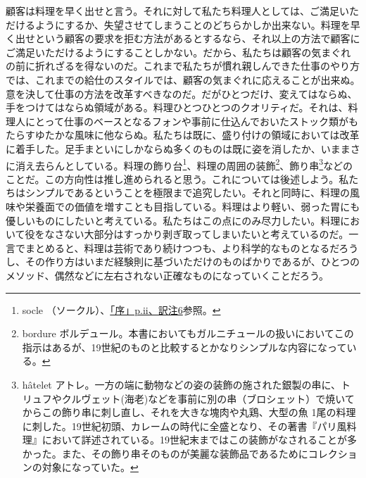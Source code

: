 顧客は料理を早く出せと言う。それに対して私たち料理人としては、ご満足いただけるようにするか、失望させてしまうことのどちらかしか出来ない。料理を早く出せという顧客の要求を拒む方法があるとするなら、それ以上の方法で顧客にご満足いただけるようにすることしかない。だから、私たちは顧客の気まぐれの前に折れざるを得ないのだ。これまで私たちが慣れ親しんできた仕事のやり方では、これまでの給仕のスタイルでは、顧客の気まぐれに応えることが出来ぬ。意を決して仕事の方法を改革すべきなのだ。だがひとつだけ、変えてはならぬ、手をつけてはならぬ領域がある。料理ひとつひとつのクオリティだ。それは、料理人にとって仕事のベースとなるフォンや事前に仕込んでおいたストック類がもたらすゆたかな風味に他ならぬ。私たちは既に、盛り付けの領域においては改革に着手した。足手まといにしかならぬ多くのものは既に姿を消したか、いままさに消え去らんとしている。料理の飾り台\footnote{socle
  （ソークル）、\protect\hyperlink{socle}{「序」p.ii、訳注6}参照。}、料理の周囲の装飾\footnote{bordure
  ボルデュール。本書においてもガルニチュールの扱いにおいてこの指示はあるが、19世紀のものと比較するとかなりシンプルな内容になっている。}、飾り串\footnote{hâtelet
  アトレ。一方の端に動物などの姿の装飾の施された銀製の串に、トリュフやクルヴェット(海老)などを事前に別の串（ブロシェット）で焼いてからこの飾り串に刺し直し、それを大きな塊肉や丸鶏、大型の魚
  1尾の料理に刺した。19世紀初頭、カレームの時代に全盛となり、その著書『パリ風料理』において詳述されている。19世紀末まではこの装飾がなされることが多かった。また、その飾り串そのものが美麗な装飾品であるためにコレクションの対象になっていた。}などのことだ。この方向性は推し進められると思う。これについては後述しよう。私たちはシンプルであるということを極限まで追究したい。それと同時に、料理の風味や栄養面での価値を増すことも目指している。料理はより軽い、弱った胃にも優しいものにしたいと考えている。私たちはこの点にのみ尽力したい。料理において役をなさない大部分はすっかり剥ぎ取ってしまいたいと考えているのだ。一言でまとめると、料理は芸術であり続けつつも、より科学的なものとなるだろうし、その作り方はいまだ経験則に基づいただけのものばかりであるが、ひとつのメソッド、偶然などに左右されない正確なものになっていくことだろう。

